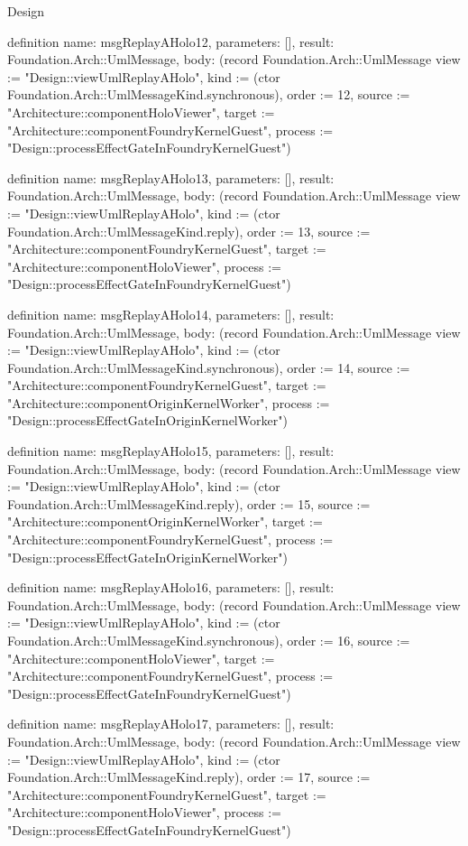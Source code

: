 \begin{lexlean}{Design}
\begin{semanticmodule}
definition{
  name: msgReplayAHolo12,
  parameters: [],
  result: Foundation.Arch::UmlMessage,
  body: (record Foundation.Arch::UmlMessage {view := "Design::viewUmlReplayAHolo", kind := (ctor Foundation.Arch::UmlMessageKind.synchronous), order := 12, source := "Architecture::componentHoloViewer", target := "Architecture::componentFoundryKernelGuest", process := "Design::processEffectGateInFoundryKernelGuest"})
}

definition{
  name: msgReplayAHolo13,
  parameters: [],
  result: Foundation.Arch::UmlMessage,
  body: (record Foundation.Arch::UmlMessage {view := "Design::viewUmlReplayAHolo", kind := (ctor Foundation.Arch::UmlMessageKind.reply), order := 13, source := "Architecture::componentFoundryKernelGuest", target := "Architecture::componentHoloViewer", process := "Design::processEffectGateInFoundryKernelGuest"})
}

definition{
  name: msgReplayAHolo14,
  parameters: [],
  result: Foundation.Arch::UmlMessage,
  body: (record Foundation.Arch::UmlMessage {view := "Design::viewUmlReplayAHolo", kind := (ctor Foundation.Arch::UmlMessageKind.synchronous), order := 14, source := "Architecture::componentFoundryKernelGuest", target := "Architecture::componentOriginKernelWorker", process := "Design::processEffectGateInOriginKernelWorker"})
}

definition{
  name: msgReplayAHolo15,
  parameters: [],
  result: Foundation.Arch::UmlMessage,
  body: (record Foundation.Arch::UmlMessage {view := "Design::viewUmlReplayAHolo", kind := (ctor Foundation.Arch::UmlMessageKind.reply), order := 15, source := "Architecture::componentOriginKernelWorker", target := "Architecture::componentFoundryKernelGuest", process := "Design::processEffectGateInOriginKernelWorker"})
}

definition{
  name: msgReplayAHolo16,
  parameters: [],
  result: Foundation.Arch::UmlMessage,
  body: (record Foundation.Arch::UmlMessage {view := "Design::viewUmlReplayAHolo", kind := (ctor Foundation.Arch::UmlMessageKind.synchronous), order := 16, source := "Architecture::componentHoloViewer", target := "Architecture::componentFoundryKernelGuest", process := "Design::processEffectGateInFoundryKernelGuest"})
}

definition{
  name: msgReplayAHolo17,
  parameters: [],
  result: Foundation.Arch::UmlMessage,
  body: (record Foundation.Arch::UmlMessage {view := "Design::viewUmlReplayAHolo", kind := (ctor Foundation.Arch::UmlMessageKind.reply), order := 17, source := "Architecture::componentFoundryKernelGuest", target := "Architecture::componentHoloViewer", process := "Design::processEffectGateInFoundryKernelGuest"})
}


\end{semanticmodule}
\end{lexlean}
